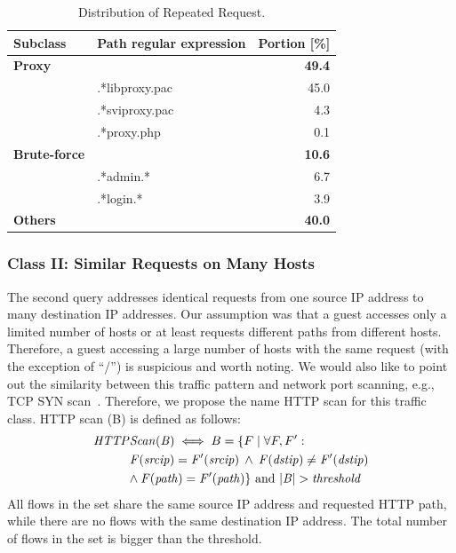 \begin{table}[ht]
\centering
\begin{tabular}{l l r}
Subclass & Path regular expression & Portion [\%] \\
\hline
\textbf{Proxy} & & \textbf{49.4} \\
& .*libproxy.pac & 45.0 \\
& .*sviproxy.pac &  4.3 \\
& .*proxy.php    &  0.1 \\
\hline
\textbf{Brute-force} & & \textbf{10.6} \\
& .*admin.*            &  6.7 \\
& .*login.*            &  3.9 \\
\hline
\textbf{Others} & & \textbf{40.0} \\
\end{tabular}
\caption{Distribution of Repeated Request.}
\label{tab:httpsecurity-repeat-statistics}
\end{table}

\subsubsection{Class II: Similar Requests on Many Hosts}

The second query addresses identical requests from one source IP address to many destination IP addresses. Our assumption was that a guest accesses only a limited number of hosts or at least requests different paths from different hosts. Therefore, a guest accessing a large number of hosts with the same request (with the exception of ``/'') is suspicious and worth noting. We would also like to point out the similarity between this traffic pattern and network port scanning, e.g., TCP SYN scan~\cite{Bhuyan-2011-Surveying}. Therefore, we propose the name HTTP scan for this traffic class. HTTP scan (B) is defined as follows:
\begin{equation*}
\begin{split}
\mathit{HTTP}&\mathit{Scan(B)} \iff B = \{F \mid \forall F, F':\\
&\mathit{F(srcip) = F'(srcip) \: \land \: F(dstip) \neq F'(dstip)}\\
&\mathit{\land \: F(path) = F'(path) \} \mbox{ and } |B| > threshold}
\end{split}
\end{equation*}
All flows in the set share the same source IP address and requested HTTP path, while there are no flows with the same destination IP address. The total number of flows in the set is bigger than the threshold.

